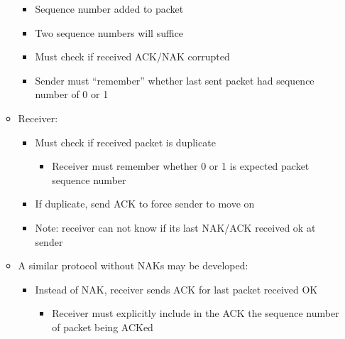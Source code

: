 \begin{itemize}
\begin{itemize}
        \begin{itemize}

          \item Sequence number added to packet

          \item Two sequence numbers will suffice

          \item Must check if received ACK/NAK corrupted

          \item Sender must ``remember'' whether last sent packet had sequence number of 0 or 1

        \end{itemize}

      \item Receiver:

        \begin{itemize}

          \item Must check if received packet is duplicate

            \begin{itemize}

              \item Receiver must remember whether 0 or 1 is expected packet sequence number

            \end{itemize}

          \item If duplicate, send ACK to force sender to move on

          \item Note: receiver can not know if its last NAK/ACK received ok at sender

        \end{itemize}

      \item A similar protocol without NAKs may be developed:

        \begin{itemize}

          \item Instead of NAK, receiver sends ACK for last packet received OK

            \begin{itemize}

              \item Receiver must explicitly include in the ACK the sequence number of packet being ACKed


\end{itemize}
\end{itemize}
\end{itemize}
\end{itemize}
